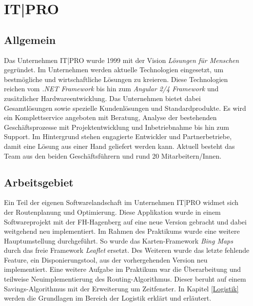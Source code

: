 \chapter{IT|PRO}
\label{IT|PRO}

\section{Allgemein}

Das Unternehmen IT|PRO wurde 1999 mit der Vision \textit{Lösungen für Menschen} gegründet. 
Im Unternehmen werden aktuelle Technologien eingesetzt, um bestmögliche und wirtschaftliche Lösungen zu kreieren. 
Diese Technologien reichen vom \textit{.NET Framework} bis hin zum \textit{Angular 2/4 Framework} und zusätzlicher Hardwareentwicklung. 
Das Unternehmen bietet dabei Gesamtlösungen sowie spezielle Kundenlösungen und Standardprodukte. 
Es wird ein Komplettservice angeboten mit Beratung, Analyse der bestehenden Geschäftsprozesse mit Projektentwicklung und Inbetriebnahme bis hin zum Support. 
Im Hintergrund stehen engagierte Entwickler und Partnerbetriebe, damit eine Lösung aus einer Hand geliefert werden kann. 
Aktuell besteht das Team aus den beiden Geschäftsführern und rund 20 Mitarbeitern/Innen. 

\section{Arbeitsgebiet}

Ein Teil der eigenen Softwarelandschaft im Unternehmen IT|PRO widmet sich der Routenplanung und Optimierung. 
Diese Applikation wurde in einem Softwareprojekt mit der FH-Hagenberg auf eine neue Version gebracht und dabei weitgehend neu implementiert. 
Im Rahmen des Praktikums wurde eine weitere Hauptumstellung durchgeführt. 
So wurde das Karten-Framework \textit{Bing Maps} durch das freie Framework \textit{Leaflet} ersetzt. 
Des Weiteren wurde das letzte fehlende Feature, ein Disponierungstool, aus der vorhergehenden Version neu implementiert. 
Eine weitere Aufgabe im Praktikum war die Überarbeitung und teilweise Neuimplementierung des Routing-Algorithmus. 
Dieser beruht auf einem Savings-Algorithmus mit der Erweiterung um Zeitfenster. 
In Kapitel \ref{Logistik} werden die Grundlagen im Bereich der Logistik erklärt und erläutert. 